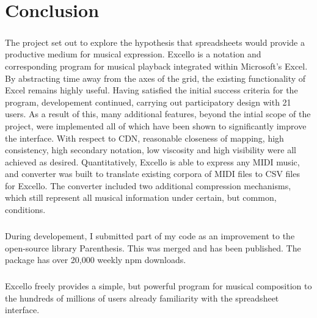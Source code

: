 
\chapter{Conclusion}

\paragraph{} The project set out to explore the hypothesis that spreadsheets would provide a productive medium for musical expression. Excello is a notation and corresponding program for musical playback integrated within Microsoft's Excel. By abstracting time away from the axes of the grid, the existing functionality of Excel remains highly useful. Having satisfied the initial success criteria for the program, developement continued, carrying out participatory design with 21 users. As a result of this, many additional features, beyond the intial scope of the project, were implemented all of which have been shown to significantly improve the interface. With respect to CDN, reasonable closeness of mapping, high consistency, high secondary notation, low viscosity and high visibility were all achieved as desired. Quantitatively, Excello is able to express any  MIDI music, and converter was built to translate existing corpora of MIDI files to CSV files for Excello. The converter included two additional compression mechanisms, which still represent all musical information under certain, but common, conditions.

\paragraph{} During developement, I submitted part of my code as an improvement to the open-source library Parenthesis. This was merged and has been published. The package has over 20,000 weekly npm downloads.

\paragraph{} Excello freely provides a simple, but powerful program for musical composition to the hundreds of millions of users already familiarity with the spreadsheet interface.
